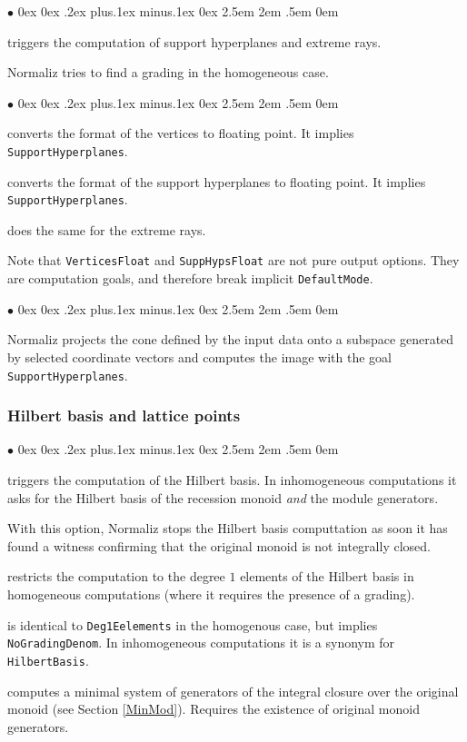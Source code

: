 \documentclass[12pt,a4paper]{scrartcl}
\newcommand{\stdli}{ \topsep0ex \partopsep0ex %
\parsep.2ex plus.1ex minus.1ex \itemsep0ex%
\leftmargin2.5em \labelwidth2em \labelsep.5em \rightmargin0em}%
\renewenvironment{itemize}{\begin{list}{{$\bullet$}}{\stdli}}{\end{list}}
\theoremstyle{definition}
\def\itemtt[#1]{\item[\textbf{\ttt{#1}}]}
\def\ttt{\texttt}
\begin{document}
\begin{itemize}
	\itemtt[SupportHyperplanes, -s] triggers the computation of support hyperplanes and extreme rays.
\end{itemize}

Normaliz tries to find a grading in the homogeneous case.

\begin{itemize}
	\itemtt[VerticesFloat] converts the format of the vertices to floating point. It implies \texttt{SupportHyperplanes}.
	\itemtt[SuppHypsFloat] converts the format of  the support hyperplanes to floating point. It implies \texttt{SupportHyperplanes}.
	\itemtt[ExtremeRaysFloat] does the same for the extreme rays.
\end{itemize}

Note that \texttt{VerticesFloat} and \texttt{SuppHypsFloat} are not pure output options. They are computation goals, and therefore break implicit \texttt{DefaultMode}.

\begin{itemize}
	\itemtt[ProjectCone] Normaliz projects the cone defined by the input data onto a subspace generated by selected coordinate vectors and computes the image with the goal \verb|SupportHyperplanes|.
\end{itemize}


\subsubsection{Hilbert basis and lattice points}

\begin{itemize}
	
	\itemtt[HilbertBasis, -N] triggers the computation of the Hilbert basis. In inhomogeneous computations it asks for the Hilbert basis of the recession monoid \emph{and} the module generators.
	
	\itemtt [WitnessNotIntegrallyClosed] With this option, Normaliz stops the Hilbert basis computtation as soon it has found a witness confirming that the original monoid is not integrally closed. 
	
	\itemtt[Deg1Elements, -1] restricts the computation to the degree $1$ elements of the Hilbert basis in homogeneous computations (where it requires the presence of a grading). 
	
	\itemtt[LatticePoints] is identical to \verb|Deg1Eelements| in the homogenous case, but implies \verb|NoGradingDenom|. In inhomogeneous computations it is a synonym for \verb|HilbertBasis|.
	
	\itemtt[ModuleGeneratorsOverOriginalMonoid, -M] computes a minimal system of generators of the integral closure over the original monoid (see Section \ref{MinMod}). Requires the existence of original monoid generators.
\end{itemize}
\end{document}
